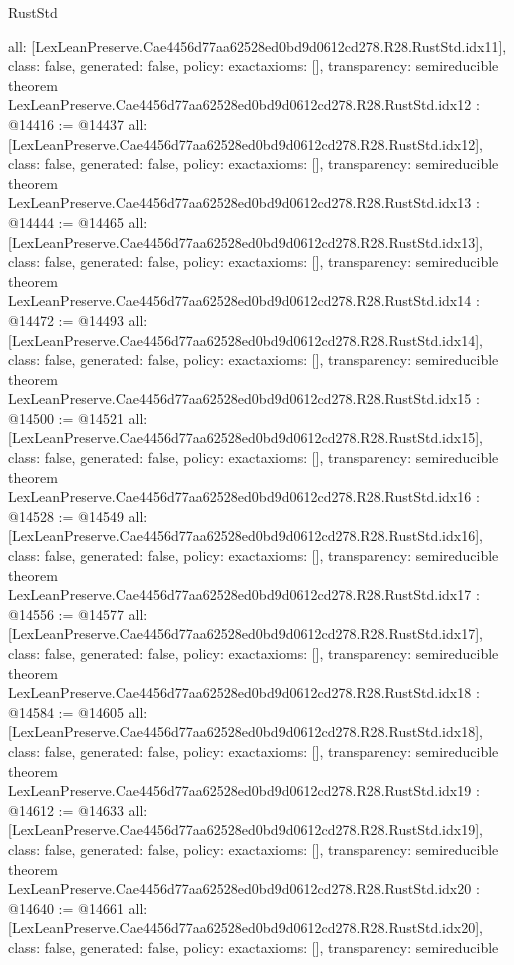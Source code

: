 \begin{lexlean}{RustStd}
\begin{coremodule}
{  all: [LexLeanPreserve.Cae4456d77aa62528ed0bd9d0612cd278.R28.RustStd.idx11],
  class: false,
  generated: false,
  policy: exact{axioms: []},
  transparency: semireducible
}
theorem LexLeanPreserve.Cae4456d77aa62528ed0bd9d0612cd278.R28.RustStd.idx12 : @14416 := @14437 {
  all: [LexLeanPreserve.Cae4456d77aa62528ed0bd9d0612cd278.R28.RustStd.idx12],
  class: false,
  generated: false,
  policy: exact{axioms: []},
  transparency: semireducible
}
theorem LexLeanPreserve.Cae4456d77aa62528ed0bd9d0612cd278.R28.RustStd.idx13 : @14444 := @14465 {
  all: [LexLeanPreserve.Cae4456d77aa62528ed0bd9d0612cd278.R28.RustStd.idx13],
  class: false,
  generated: false,
  policy: exact{axioms: []},
  transparency: semireducible
}
theorem LexLeanPreserve.Cae4456d77aa62528ed0bd9d0612cd278.R28.RustStd.idx14 : @14472 := @14493 {
  all: [LexLeanPreserve.Cae4456d77aa62528ed0bd9d0612cd278.R28.RustStd.idx14],
  class: false,
  generated: false,
  policy: exact{axioms: []},
  transparency: semireducible
}
theorem LexLeanPreserve.Cae4456d77aa62528ed0bd9d0612cd278.R28.RustStd.idx15 : @14500 := @14521 {
  all: [LexLeanPreserve.Cae4456d77aa62528ed0bd9d0612cd278.R28.RustStd.idx15],
  class: false,
  generated: false,
  policy: exact{axioms: []},
  transparency: semireducible
}
theorem LexLeanPreserve.Cae4456d77aa62528ed0bd9d0612cd278.R28.RustStd.idx16 : @14528 := @14549 {
  all: [LexLeanPreserve.Cae4456d77aa62528ed0bd9d0612cd278.R28.RustStd.idx16],
  class: false,
  generated: false,
  policy: exact{axioms: []},
  transparency: semireducible
}
theorem LexLeanPreserve.Cae4456d77aa62528ed0bd9d0612cd278.R28.RustStd.idx17 : @14556 := @14577 {
  all: [LexLeanPreserve.Cae4456d77aa62528ed0bd9d0612cd278.R28.RustStd.idx17],
  class: false,
  generated: false,
  policy: exact{axioms: []},
  transparency: semireducible
}
theorem LexLeanPreserve.Cae4456d77aa62528ed0bd9d0612cd278.R28.RustStd.idx18 : @14584 := @14605 {
  all: [LexLeanPreserve.Cae4456d77aa62528ed0bd9d0612cd278.R28.RustStd.idx18],
  class: false,
  generated: false,
  policy: exact{axioms: []},
  transparency: semireducible
}
theorem LexLeanPreserve.Cae4456d77aa62528ed0bd9d0612cd278.R28.RustStd.idx19 : @14612 := @14633 {
  all: [LexLeanPreserve.Cae4456d77aa62528ed0bd9d0612cd278.R28.RustStd.idx19],
  class: false,
  generated: false,
  policy: exact{axioms: []},
  transparency: semireducible
}
theorem LexLeanPreserve.Cae4456d77aa62528ed0bd9d0612cd278.R28.RustStd.idx20 : @14640 := @14661 {
  all: [LexLeanPreserve.Cae4456d77aa62528ed0bd9d0612cd278.R28.RustStd.idx20],
  class: false,
  generated: false,
  policy: exact{axioms: []},
  transparency: semireducible
}
\end{coremodule}
\end{lexlean}

